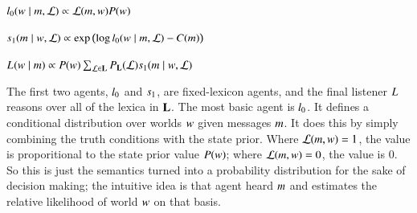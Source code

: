 \documentclass[leqno,12pt]{article}
\begin{document}
\begin{examples}
\item\label{agents}
  \begin{examples}

  \item\label{l0}%
    $l_{0}(w \mid m, \mathcal{L}) \propto \mathcal{L}(m, w)P(w)$



  \item\label{s1}%
    $s_{1}(m \mid w, \mathcal{L}) \propto
    \exp
    \left(
      \log l_{0}(w \mid m, \mathcal{L})
      - 
      C(m)
    \right)$
    
  \item\label{L} 
    $L_{}(w \mid m) 
    \propto 
    P(w)
    \sum_{\mathcal{L} \in \mathbf{L}}
    P_{\mathbf{L}}(\mathcal{L})
    s_{1}(m \mid w, \mathcal{L})$
  \end{examples}
\end{examples}

The first two agents, $l_{0}$ and $s_{1}$, are
fixed-lexicon agents, and the final listener $L_{}$
reasons over all of the lexica in $\mathbf{L}$.  The most basic agent is
$l_{0}$. It defines a conditional distribution over worlds
$w$ given messages $m$. It does this by simply combining the
truth conditions with the state prior. Where $\mathcal{L}(m, w)=1$,
the value is proporitional to the state prior value
$P(w)$; where $\mathcal{L}(m, w)=0$, the value is
$0$. So this is just the semantics turned into a probability
distribution for the sake of decision making; the intuitive idea is
that agent heard $m$ and estimates the relative likelihood of world
$w$ on that basis.
\end{document}
